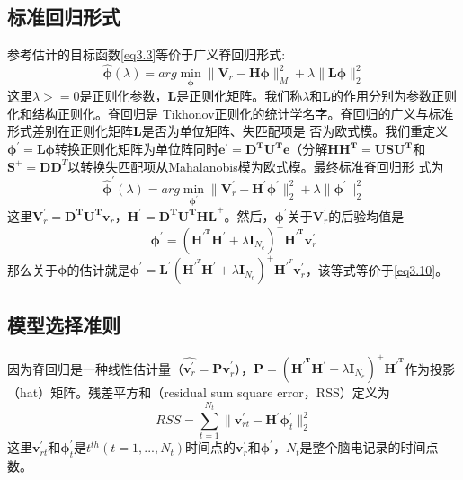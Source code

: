 \subsection{标准回归形式}
参考估计的目标函数\eqref{eq3.3}等价于广义脊回归形式:
\begin{equation}\label{eq3.11}
\hat{\mathbf{\phi}}(\lambda)=arg\min_{\mathbf{\phi}}{\lVert\mathbf{V}_{r}-\mathbf{H\phi}\rVert_{M}^{2}+\lambda\lVert\mathbf{L\phi}\rVert_2^2}
\end{equation}
这里$\lambda>=0$是正则化参数，$\mathbf{L}$是正则化矩阵。我们称$\lambda$和$\mathbf{L}$的作用分别为参数正则化和结构正则化。脊回归是
Tikhonov正则化的统计学名字。脊回归的广义与标准形式差别在正则化矩阵$\mathbf{L}$是否为单位矩阵、失匹配项是
否为欧式模。我们重定义$\mathbf{\phi^\prime=L\phi}$转换正则化矩阵为单位阵同时$\mathbf{e^\prime=D^{T}U^{T}e}$（分解$\mathbf{HH^{T}=USU^{T}}$和$\mathbf{S}^+=\mathbf{DD}^T$以转换失匹配项从Mahalanobis模为欧式模。最终标准脊回归形
式为
\begin{equation}\label{eq3.12}
\hat{\mathbf{\phi}}^\prime(\lambda)=arg\min_{\mathbf{\phi}^\prime}{\lVert{\mathbf{V}_r^\prime-\mathbf{H^\prime\phi^\prime}}\rVert_2^2+\lambda\lVert{\mathbf{\phi}^\prime}\rVert_2^2}
\end{equation}
这里$\mathbf{V}^\prime_r=\mathbf{D^TU^Tv}_r$，$\mathbf{H}^\prime=\mathbf{D^TU^THL}^+$。然后，$\mathbf{\phi}^\prime$关于$\mathbf{V}^\prime_r$的后验均值是
\begin{equation}\label{eq3.13}
\mathbf{\phi}^\prime=(\mathbf{H^{\prime^T}}\mathbf{H}^\prime+\lambda\mathbf{I}_{N_e})^+\mathbf{H^{\prime^T}}\mathbf{v}^\prime_r
\end{equation}
那么关于$\mathbf{\phi}$的估计就是$
\mathbf{\phi}^\prime=\mathbf{L}^\prime(\mathbf{H}^{\prime^T}\mathbf{H}^\prime+\lambda\mathbf{I}_{N_e})^+\mathbf{H}^{\prime^T}\mathbf{v}^\prime_r$，该等式等价于\eqref{eq3.10}。
\subsection{模型选择准则}
因为脊回归是一种线性估计量（$\hat{\mathbf{v}^\prime_r}={\mathbf{Pv}^\prime_r}$），$\mathbf{P}=(\mathbf{H^{\prime^T}}\mathbf{H}^\prime+\lambda\mathbf{I}_{N_{e}})^{+}\mathbf{H^{\prime^T}}$作为投影（hat）矩阵。残差平方和（residual sum square error，RSS）定义为
\begin{equation}
RSS=\sum_{t=1}^{N_{t}}\lVert\mathbf{v}^\prime_{rt}-\mathbf{H}^\prime\mathbf{\phi}^\prime_t\rVert_2^2
\end{equation}
这里$\mathbf{v}^\prime_{rt}$和$\mathbf{\phi}^\prime_{t}$是$t^{th}(t=1,...,N_t)$时间点的$\mathbf{v}^\prime_r$和$\mathbf{\phi}^\prime$，$N_t$是整个脑电记录的时间点数。

